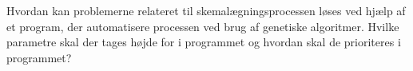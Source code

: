 Hvordan kan problemerne relateret til skemalægningsprocessen løses ved hjælp af et program, der automatisere processen ved brug af genetiske algoritmer. Hvilke parametre skal der tages højde for i programmet og hvordan skal de prioriteres i programmet?